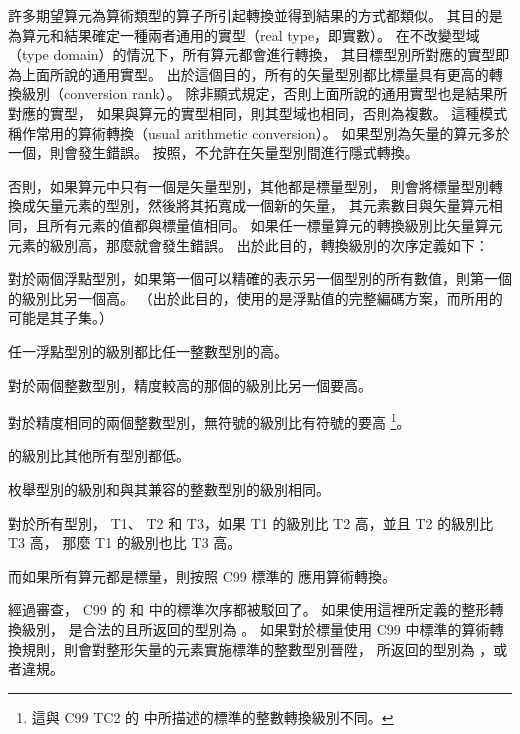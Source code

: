 許多期望算元為算術類型的算子所引起轉換並得到結果的方式都類似。
其目的是為算元和結果確定一種兩者通用的實型（real type，即實數）。
在不改變型域（type domain）的情況下，所有算元都會進行轉換，
其目標型別所對應的實型即為上面所說的通用實型。
出於這個目的，所有的矢量型別都比標量具有更高的轉換級別（conversion rank）。
除非顯式規定，否則上面所說的通用實型也是結果所對應的實型，
如果與算元的實型相同，則其型域也相同，否則為複數。
這種模式稱作常用的算術轉換（usual arithmetic conversion）。
如果型別為矢量的算元多於一個，則會發生錯誤。
按照，不允許在矢量型別間進行隱式轉換。

否則，如果算元中只有一個是矢量型別，其他都是標量型別，
則會將標量型別轉換成矢量元素的型別，然後將其拓寬成一個新的矢量，
其元素數目與矢量算元相同，且所有元素的值都與標量值相同。
如果任一標量算元的轉換級別比矢量算元元素的級別高，那麼就會發生錯誤。
出於此目的，轉換級別的次序定義如下：
\startigNum
\item 對於兩個浮點型別，如果第一個可以精確的表示另一個型別的所有數值，則第一個的級別比另一個高。
（出於此目的，使用的是浮點值的完整編碼方案，而所用的可能是其子集。）

\item 任一浮點型別的級別都比任一整數型別的高。

\item 對於兩個整數型別，精度較高的那個的級別比另一個要高。

\item 對於精度相同的兩個整數型別，無符號的級別比有符號的要高
\footnote{這與 C99 TC2 的{} 中所描述的標準的整數轉換級別不同。}。

\item {} 的級別比其他所有型別都低。

\item 枚舉型別的級別和與其兼容的整數型別的級別相同。

\item 對於所有型別， T1、 T2 和 T3，如果 T1 的級別比 T2 高，並且 T2 的級別比 T3 高，
那麼 T1 的級別也比 T3 高。
\stopigNum

而如果所有算元都是標量，則按照 C99 標準的{} 應用算術轉換。

\startnotepar
經過審查， C99 的{} 和{} 中的標準次序都被駁回了。
如果使用這裡所定義的整形轉換級別，  是合法的且所返回的型別為 。
如果對於標量使用 C99 中標準的算術轉換規則，則會對整形矢量的元素實施標準的整數型別晉陞，
  所返回的型別為 ，或者違規。
\stopnotepar


